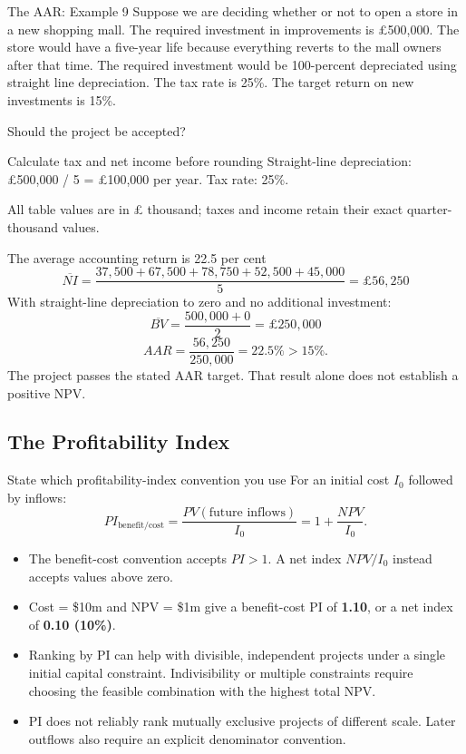 \documentclass[9pt,aspectratio=169]{beamer}
\begin{document}
\begin{frame}{The AAR: Example 9}
Suppose we are deciding whether or not to open a store in a new shopping mall. The required investment in improvements is £500,000. The store would have a five-year life because everything reverts to the mall owners after that time. The required investment would be 100-percent depreciated using straight line depreciation. The tax rate is 25\%. The target return on new investments is 15\%.

Should the project be accepted?
\end{frame}

\begin{frame}{Calculate tax and net income before rounding}
Straight-line depreciation: £500,000 / 5 = £100,000 per year. Tax rate: 25\%.
\begin{center}\end{center}
All table values are in £ thousand; taxes and income retain their exact quarter-thousand values.
\end{frame}

\begin{frame}{The average accounting return is 22.5 per cent}
\[
\overline{NI}=\frac{37{,}500+67{,}500+78{,}750+52{,}500+45{,}000}{5}=\text{£}56{,}250
\]
With straight-line depreciation to zero and no additional investment:
\[
\overline{BV}=\frac{500{,}000+0}{2}=\text{£}250{,}000
\]
\[
AAR=\frac{56{,}250}{250{,}000}=\boxed{22.5\%>15\%}.
\]
The project passes the stated AAR target. That result alone does not establish a positive NPV.
\end{frame}

\subsection{The Profitability Index}

\begin{frame}{State which profitability-index convention you use}
For an initial cost $I_0$ followed by inflows:
\[
PI_{\mathrm{benefit/cost}}=\frac{PV(\text{future inflows})}{I_0}
=1+\frac{NPV}{I_0}.
\]
\begin{itemize}
\item The benefit-cost convention accepts $PI>1$. A net index $NPV/I_0$ instead accepts values above zero.
\item Cost = \$10m and NPV = \$1m give a benefit-cost PI of \textbf{1.10}, or a net index of \textbf{0.10 (10\%)}.
\item Ranking by PI can help with divisible, independent projects under a single initial capital constraint. Indivisibility or multiple constraints require choosing the feasible combination with the highest total NPV.
\item PI does not reliably rank mutually exclusive projects of different scale. Later outflows also require an explicit denominator convention.
\end{itemize}
\end{frame}
\end{document}
